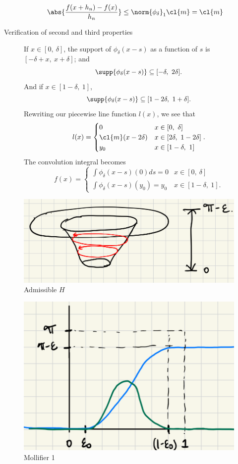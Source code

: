 \documentclass[../main-v2-manifolds.tex]{subfiles}
\begin{document}
\begin{description}
\begin{align*}
        \abs{\dfrac{f(x+h_n) - f(x)}{h_n}}&\leq\norm{\phi_\delta}_{1}\cl{m} = \cl{m}
    \end{align*}
    \item[Verification of second and third properties]
    If $x\in [0,\ \delta]$,  the support of $\phi_\delta(x-s)$ as a function of $s$ is $[-\delta + x,\ x + \delta]$; and 
    \[
        \supp{\phi_{\delta}(x-s)}\subseteq[-\delta,\ 2\delta].
    \]
    And if $x\in [1-\delta,\ 1]$, 
    \[
        \supp{\phi_\delta(x-s)}\subseteq [1-2\delta,\ 1+\delta].
    \]
    Rewriting our piecewise line function $l(x)$, we see that 
    \[
        l(x) = \begin{cases}
            0 &  x\in[0,\ \delta] \\
            \cl{m}(x-2\delta) &  x\in[2\delta,\ 1-2\delta]\\
            y_0 &  x\in[1-\delta,\ 1]
        \end{cases}.
    \]
    The convolution integral becomes
    \[
        f(x) = \begin{cases}
            \int \phi_{\delta}(x-s)(0)ds = 0 & x\in[0,\ \delta]\\
            \int \phi_{\delta}(x-s)(y_0) = y_0 & x\in[1-\delta,\ 1].
        \end{cases}
    \]
    \end{description}
    \begin{figure}[h!]
    \centering
    \includegraphics[width=0.75\linewidth]{images/mollifier-1-neck-hamiltonian.png}
    \caption{Admissible $H$}
    \label{fig:mollifier-1-neck-hamiltonian}
\end{figure}
\begin{figure}[h!]
    \centering
    \includegraphics[width=0.7\linewidth]{images/mollifier-1-f.png}
    \caption{Mollifier 1}
    \label{fig:mollifier-1-f}
\end{figure}
\end{document}
